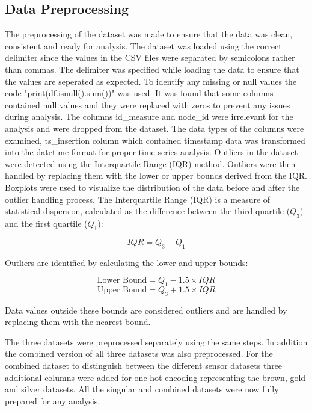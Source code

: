 \documentclass[conference]{IEEEtran}
\begin{document}
\subsection{Data Preprocessing}
The preprocessing of the dataset was made to ensure that the data was clean, consistent and ready for analysis. The dataset was loaded using the correct delimiter since the values in the CSV files were separated by semicolons rather than commas. The delimiter was specified while loading the data to ensure that the values are seperated as expected.
\vspace{5mm}
To identify any missing or null values the code "print(df.isnull().sum())" was used. It was found that some columns contained null values and they were replaced with zeros to prevent any issues during analysis.
\vspace{5mm}
The columns id\_measure and node\_id were irrelevant for the analysis and were dropped from the dataset. The data types of the columns were examined, ts\_insertion column which contained timestamp data was transformed into the datetime format for proper time series analysis.
\vspace{5mm}
Outliers in the dataset were detected using the Interquartile Range (IQR) method. Outliers were then handled by replacing them with the lower or upper bounds derived from the IQR. Boxplots were used to visualize the distribution of the data before and after the outlier handling process.
\vspace{5mm}
\newpage
The Interquartile Range (IQR) is a measure of statistical dispersion, calculated as the difference between the third quartile (\( Q_3 \)) and the first quartile (\( Q_1 \)):

\[
IQR = Q_3 - Q_1
\]

Outliers are identified by calculating the lower and upper bounds:

\[
\text{Lower Bound} = Q_1 - 1.5 \times IQR
\]
\[
\text{Upper Bound} = Q_3 + 1.5 \times IQR
\]

Data values outside these bounds are considered outliers and are handled by replacing them with the nearest bound.
\vspace{5mm}

The three datasets were preprocessed separately using the same steps. In addition the combined version of all three datasets was also preprocessed. For the combined dataset to distinguish between the different sensor datasets three additional columns were added for one-hot encoding representing the brown, gold and silver datasets. All the singular and combined datasets were now fully prepared for any analysis.
\vspace{5mm}
\end{document}
